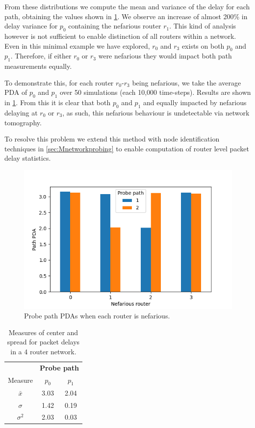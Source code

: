 \noindent From these distributions we compute the mean and variance of the delay for each path, obtaining the values shown in \cref{tbl:4routerstats}. We observe an increase of almost 200\% in delay variance for $p_0$ containing the nefarious router $r_1$. This kind of analysis however is not sufficient to enable distinction of all routers within a network. Even in this minimal example we have explored, $r_0$ and $r_3$ exists on both $p_0$ and $p_1$. Therefore, if either $r_0$ or $r_3$ were nefarious they would impact both path measurements equally.\par
To demonstrate this, for each router $r_0$-$r_3$ being nefarious, we take the average PDA of $p_0$ and $p_1$ over 50 simulations (each 10,000 time-steps). Results are shown in \cref{fig:probepathpdas}. From this it is clear that both $p_0$ and $p_1$ and equally impacted by nefarious delaying at $r_0$ or $r_3$, as such, this nefarious behaviour is undetectable via network tomography.\par
To resolve this problem we extend this method with node identification techniques in \cref{sec:Mnetworkprobing} to enable computation of router level packet delay statistics.
\begin{figure}[t]
    \centering
    \includegraphics{figs/background/path_pdas.png}
    \caption{Probe path PDAs when each router is nefarious.}
    \label{fig:probepathpdas}
\end{figure}
\begin{table}[H]
    \centering
    \begin{tabular}{@{}ccc@{}}
        \toprule
        & \multicolumn{2}{c}{\textbf{Probe path}}\\
        \cmidrule(lr){2-3}
        Measure & $p_0$ & $p_1$ \\
        \midrule
        $\bar{x}$   & 3.03 & 2.04 \\
        $\sigma$    & 1.42 & 0.19 \\
        $\sigma^2$  & 2.03 & 0.03 \\
        \bottomrule
    \end{tabular}
    \caption{Measures of center and spread for packet delays in a 4 router network.}
    \label{tbl:4routerstats}
\end{table}

